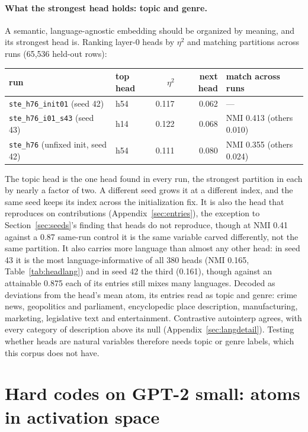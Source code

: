 \paragraph{What the strongest head holds: topic and genre.} A semantic,
language-agnostic embedding should be organized by meaning, and its
strongest head is. Ranking layer-0 heads by $\eta^2$ and matching
partitions across runs (65{,}536 held-out rows):

\begin{center}\small\setlength{\tabcolsep}{4pt}
\begin{tabular}{@{}llrrl@{}}
\toprule
run & top head & $\eta^2$ & next head & match across runs \\
\midrule
\texttt{ste\_h76\_init01} (seed 42) & h54 & 0.117 & 0.062 & --- \\
\texttt{ste\_h76\_i01\_s43} (seed 43) & h14 & 0.122 & 0.068 & NMI 0.413 (others 0.010) \\
\texttt{ste\_h76} (unfixed init, seed 42) & h54 & 0.111 & 0.080 & NMI 0.355 (others 0.024) \\
\bottomrule
\end{tabular}
\end{center}

The topic head is the one head found in every run, the strongest
partition in each by nearly a factor of two. A different seed grows it at
a different index, and the same seed keeps its index across the
initialization fix. It is also the head that reproduces on contributions
(Appendix~\ref{sec:entries}), the exception to Section~\ref{sec:seeds}'s
finding that heads do not reproduce, though at NMI 0.41 against a 0.87
same-run control it is the same variable carved differently, not the same
partition. It also carries more language than almost any other head: in
seed 43 it is the most language-informative of all 380 heads (NMI 0.165,
Table~\ref{tab:headlang}) and in seed 42 the third (0.161), though
against an attainable 0.875 each of its entries still mixes many
languages. Decoded as deviations
from the head's mean atom, its entries read as topic and genre: crime
news, geopolitics and parliament, encyclopedic place description,
manufacturing, marketing, legislative text and entertainment. Contrastive
autointerp agrees, with every category of description above its
null (Appendix~\ref{sec:langdetail}). Testing whether heads are natural
variables therefore needs topic or genre labels, which this corpus does
not have.

\section{Hard codes on GPT-2 small: atoms in activation space}
\label{sec:gpt2hard}

